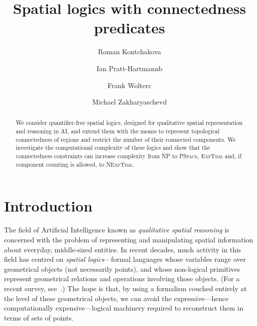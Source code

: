 \documentclass{LMCS}
\title[Spatial logics with connectedness predicates]{Spatial logics with connectedness predicates\rsuper*}
\author[R.~Kontchakov]{Roman Kontchakov\rsuper a}	\address{{\lsuper a}Department of Computer Science and Information Systems, Birkbeck College London}	\email{roman@dcs.bbk.ac.uk}
\author[I.~Pratt-Hartmann]{Ian Pratt-Hartmann\rsuper b}	\address{{\lsuper b}Department of Computer Science, Manchester University}	\email{ipratt@cs.man.ac.uk}
\author[F.~Wolter]{Frank Wolter\rsuper c}	\address{{\lsuper c}Department of Computer Science, University of Liverpool}	\email{frank@csc.liv.ac.uk}
\author[M.~Zakharyaschev]{Michael Zakharyaschev\rsuper d}	\address{{\lsuper d}Department of Computer Science and Information Systems, Birkbeck College London}	\email{michael@dcs.bbk.ac.uk}
\theoremstyle{plain}
\newcommand{\NP}{\textsc{NP}}
\newcommand{\PSpace}{\textsc{PSpace}}
\newcommand{\ExpTime}{\textsc{ExpTime}}
\newcommand{\NExpTime}{\textsc{NExpTime}}
\begin{document}
\maketitle

\begin{abstract}
We consider quantifier-free spatial logics, designed for qualitative
spatial representation and reasoning in AI, and extend them with the
means to represent topological connectedness of regions and restrict
the number of their connected components. We investigate the
computational complexity of these logics and show that the
connectedness constraints can increase complexity from \NP{} to
\PSpace{}, \ExpTime{} and, if component counting is allowed, to
\NExpTime{}.
\end{abstract}





\section{Introduction}
\label{sec:intro}


The field of Artificial Intelligence known as \emph{qualitative spatial
reasoning} is concerned with the problem of representing and
manipulating spatial information about everyday, middle-sized
entities. In recent decades, much activity in this field has centred
on {\em spatial logics}---formal languages whose variables range over
geometrical objects (not necessarily points), and whose non-logical
primitives represent geometrical relations and operations involving
those objects. (For a recent survey, see~\cite{Cohn&Renz08}.)  The
hope is that, by using a formalism couched entirely at the level of
these geometrical objects, we can avoid the expressive---hence
computationally expensive---logical machinery required to reconstruct
them in terms of sets of points.
\end{document}
